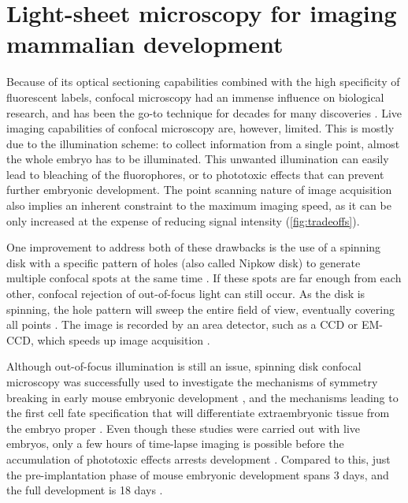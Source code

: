 \section{Light-sheet microscopy for imaging mammalian development}

  Because of its optical sectioning capabilities combined with the high specificity of fluorescent labels, confocal microscopy had an immense influence on biological research, and has been the go-to technique for decades for many discoveries \cite{shotton_confocal_1989,graf_live_2005,jonkman_any_2015}.
  Live imaging capabilities of confocal microscopy are, however, limited. This is mostly due to the illumination scheme: to collect information from a single point, almost the whole embryo has to be illuminated. This unwanted illumination can easily lead to bleaching of the fluorophores, or to phototoxic effects that can prevent further embryonic development. The point scanning nature of image acquisition also implies an inherent constraint to the maximum imaging speed, as it can be only increased at the expense of reducing signal intensity (\autoref{fig:tradeoffs}).

  One improvement to address both of these drawbacks is the use of a spinning disk with a specific pattern of holes (also called Nipkow disk) to generate multiple confocal spots at the same time \cite{graf_live_2005}. If these spots are far enough from each other, confocal rejection of out-of-focus light can still occur. As the disk is spinning, the hole pattern will sweep the entire field of view, eventually covering all points \cite{kino_intermediate_1990}. The image is recorded by an area detector, such as a CCD or EM-CCD, which speeds up image acquisition \cite{nakano_spinning-disk_2002}.

  Although out-of-focus illumination is still an issue, spinning disk confocal microscopy was successfully used to investigate the mechanisms of symmetry breaking in early mouse embryonic development \cite{korotkevich_apical_2017}, and the mechanisms leading to the first cell fate specification that will differentiate extraembryonic tissue from the embryo proper \cite{maitre_pulsatile_2015,dietrich_venus_2015,maitre_asymmetric_2016}. Even though these studies were carried out with live embryos, only a few hours of time-lapse imaging is possible before the accumulation of phototoxic effects arrests development \cite{nowotschin_chapter_2010}. Compared to this, just the pre-implantation phase of mouse embryonic development spans 3 days, and the full development is 18 days \cite{wolpert_principles_2011}.


